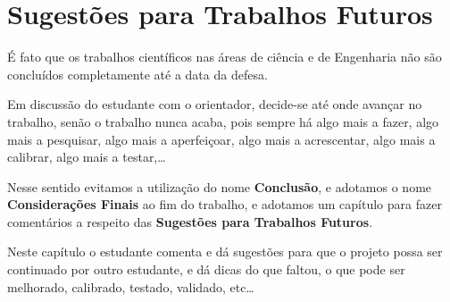 % 
%
\chapter{Sugestões para Trabalhos Futuros}

    É fato que os trabalhos científicos nas áreas de ciência e de Engenharia não são concluídos completamente até a data da defesa.
    
    Em discussão do estudante com o orientador, decide-se até onde avançar no trabalho, senão o trabalho nunca acaba, pois sempre há algo mais a fazer, algo mais a pesquisar, algo mais a aperfeiçoar, algo mais a acrescentar, algo mais a calibrar, algo mais a testar,\ldots

    Nesse sentido evitamos a utilização do nome {\bf Conclusão}, e adotamos o nome {\bf Considerações Finais} ao fim do trabalho, e adotamos um capítulo para fazer comentários a respeito das {\bf Sugestões para Trabalhos Futuros}.

    Neste capítulo o estudante comenta e dá sugestões para que o projeto possa ser continuado por outro estudante, e dá dicas do que faltou, o que pode ser melhorado, calibrado, testado, validado, etc\ldots